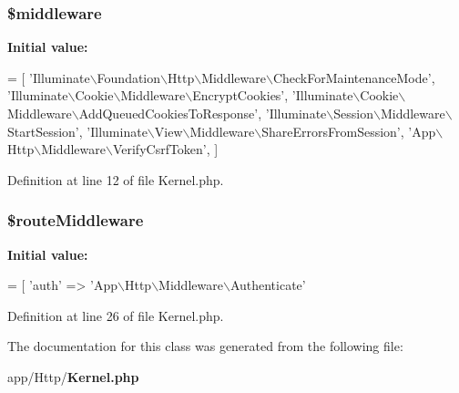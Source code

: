 \subsubsection[{\$middleware}]{\setlength{\rightskip}{0pt plus 5cm}\${\bf middleware}\hspace{0.3cm}{\ttfamily [protected]}}\label{class_app_1_1_http_1_1_kernel_a36a993ea76b635c84749f6e5e6562344}
{\bfseries Initial value\+:}
\begin{DoxyCode}
= [
        \textcolor{stringliteral}{'Illuminate\(\backslash\)Foundation\(\backslash\)Http\(\backslash\)Middleware\(\backslash\)CheckForMaintenanceMode'},
        \textcolor{stringliteral}{'Illuminate\(\backslash\)Cookie\(\backslash\)Middleware\(\backslash\)EncryptCookies'},
        \textcolor{stringliteral}{'Illuminate\(\backslash\)Cookie\(\backslash\)Middleware\(\backslash\)AddQueuedCookiesToResponse'},
        \textcolor{stringliteral}{'Illuminate\(\backslash\)Session\(\backslash\)Middleware\(\backslash\)StartSession'},
        \textcolor{stringliteral}{'Illuminate\(\backslash\)View\(\backslash\)Middleware\(\backslash\)ShareErrorsFromSession'},
        \textcolor{stringliteral}{'App\(\backslash\)Http\(\backslash\)Middleware\(\backslash\)VerifyCsrfToken'},
    ]
\end{DoxyCode}


Definition at line 12 of file Kernel.\+php.

\subsubsection[{\$route\+Middleware}]{\setlength{\rightskip}{0pt plus 5cm}\$route\+Middleware\hspace{0.3cm}{\ttfamily [protected]}}\label{class_app_1_1_http_1_1_kernel_ae5bf89bfdb0e63f0e05f25a03d805148}
{\bfseries Initial value\+:}
\begin{DoxyCode}
= [
        \textcolor{stringliteral}{'auth'} => \textcolor{stringliteral}{'App\(\backslash\)Http\(\backslash\)Middleware\(\backslash\)Authenticate'}
\end{DoxyCode}


Definition at line 26 of file Kernel.\+php.



The documentation for this class was generated from the following file\+:\begin{DoxyCompactItemize}
\item 
app/\+Http/{\bf Kernel.\+php}\end{DoxyCompactItemize}
